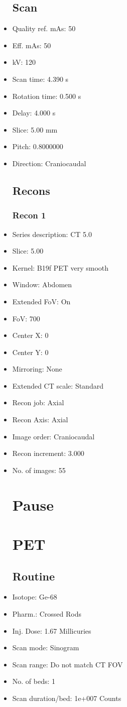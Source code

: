 \documentclass[12pt]{article}
\begin{document}
\begin{itemize}
\subsection{Scan}
\item Quality ref. mAs: 50\item Eff. mAs: 50\item kV: 120\item Scan time: 4.390 s\item Rotation time: 0.500 s\item Delay: 4.000 s\item Slice: 5.00 mm\item Pitch: 0.8000000\item Direction: Craniocaudal\subsection{Recons}

\subsubsection{Recon 1}
\item Series description: CT 5.0
\item Slice: 5.00
\item Kernel: B19f PET very smooth
\item Window: Abdomen
\item Extended FoV: On
\item FoV: 700
\item Center X: 0
\item Center Y: 0
\item Mirroring: None
\item Extended CT scale: Standard
\item Recon job: Axial
\item Recon Axis: Axial
\item Image order: Craniocaudal
\item Recon increment: 3.000
\item No. of images: 55
\section{Pause}
\section{PET}\subsection{Routine}
\item Isotope: Ge-68
\item Pharm.: Crossed Rods
\item Inj. Dose: 1.67 Millicuries
\item Scan mode: Sinogram
\item Scan range: Do not match CT FOV
\item No. of beds: 1
\item Scan duration/bed: 1e+007 Counts

\end{itemize}
\end{document}
